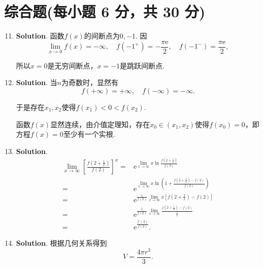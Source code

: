 \documentclass[../Main.tex]{subfiles}
\begin{document}
\section{综合题(每小题 6 分，共 30 分)}
\begin{enumerate}
    \setcounter{enumi}{10}
    \item \textbf{Solution}. 函数$f(x)$的间断点为$0,-1$. 因
          \[
              \lim_{x\to0}f(x)=-\infty,\quad f(-1^{+})=-\frac{\pi\mathrm{e}}{2},\quad f
                  (-1^{-})=\frac{\pi\mathrm{e}}{2},
          \]

          所以$x=0$是无穷间断点，$x=-1$是跳跃间断点.

    \item \textbf{Solution}. 当$n$为奇数时，显然有
          \[
              f\left(+\infty\right)=+\infty,\quad f\left(-\infty\right)=-\infty.
          \]

          于是存在$x_{1},x_{2}$使得$f(x_{1})<0<f(x_{2})$.

          函数$f(x)$显然连续，由介值定理知，存在$x_{0}\in(x_{1},x_{2})$使得$f(x_{0})=
              0$，即方程$f(x)=0$至少有一个实根.

    \item \textbf{Solution}.
          \[
              \begin{aligned}
                  \lim_{x\to\infty}\left[\frac{f\left(2+\frac{1}{x}\right)}{f(2)}\right]^{x} = & \mathrm{e}^{\lim\limits_{x\to\infty}x\ln\frac{f\left(2+\frac{1}{x}\right)}{f(2)}}                       \\
                  =                                                                            & \mathrm{e}^{\lim\limits_{x\to\infty}x\ln\left(1+\frac{f\left(2+\frac{1}{x}\right)-f(2)}{f(2)}\right)}   \\
                  =                                                                            & \mathrm{e}^{\frac{1}{f(2)}\lim\limits_{x\to\infty}x\left[f\left(2+\frac{1}{x}\right)-f(2)\right]}       \\
                  =                                                                            & \mathrm{e}^{\frac{1}{f(2)}\lim\limits_{x\to\infty}\frac{f\left(2+\frac{1}{x}\right)-f(2)}{\frac{1}{x}}} \\
                  =                                                                            & \mathrm{e}^{\frac{f'(2)}{f(2)}}.
              \end{aligned}
          \]

    \item \textbf{Solution}. 根据几何关系得到
          \[
              V=\frac{4\pi r^{3}}{3}.
          \]


\end{enumerate}
\end{document}
